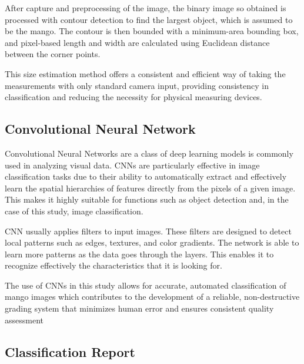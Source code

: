 After capture and preprocessing of the image, the binary image so obtained is
processed with contour detection to find the largest object, which is assumed to
be the mango. The contour is then bounded with a minimum-area bounding box, and
pixel-based length and width are calculated using Euclidean distance between the
corner points.

This size estimation method offers a consistent and efficient way of taking the
measurements with only standard camera input, providing consistency in
classification and reducing the necessity for physical measuring devices.


\subsection{Convolutional Neural Network}
Convolutional Neural Networks are a class of deep learning models is commonly
used in analyzing visual data. CNNs are particularly effective in image
classification tasks due to their ability to automatically extract and
effectively learn the spatial hierarchies of features directly from the pixels
of a given image. This makes it highly suitable for functions such as object
detection and, in the case of this study, image classification.

CNN usually applies filters to input images.  These filters are designed to
detect local patterns such as edges, textures, and color gradients. The network
is able to learn more patterns as the data goes through the layers. This enables
it to recognize effectively the characteristics that it is looking for.

The use of CNNs in this study allows for accurate, automated classification of
mango images which contributes to the development of a reliable, non-destructive
grading system that minimizes human error and ensures consistent quality
assessment


\subsection{Classification Report}

